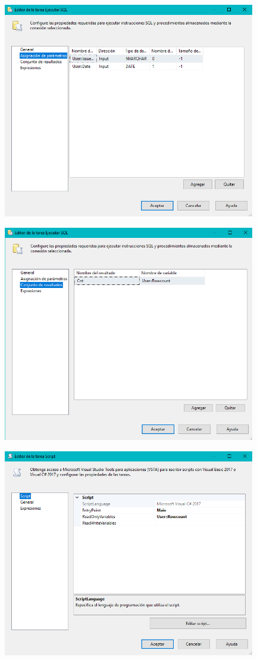 \begin{itemize}
\begin{center}
	\end{center}	
	\begin{center}
	\includegraphics[width=11cm]{./Imagenes/img24}
	\end{center}	
	\begin{center}
	\includegraphics[width=11cm]{./Imagenes/img25}
	\end{center}	
	\begin{center}
	\includegraphics[width=11cm]{./Imagenes/img26}
	\end{center}	
	\begin{center}


\end{center}
\end{itemize}
